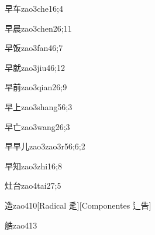 \begin{verbete}{早车}{zao3che1}{6;4}
\end{verbete}

\begin{verbete}{早晨}{zao3chen2}{6;11}
\end{verbete}

\begin{verbete}{早饭}{zao3fan4}{6;7}
\end{verbete}

\begin{verbete}{早就}{zao3jiu4}{6;12}
\end{verbete}

\begin{verbete}{早前}{zao3qian2}{6;9}
\end{verbete}

\begin{verbete}{早上}{zao3shang5}{6;3}
\end{verbete}

\begin{verbete}{早亡}{zao3wang2}{6;3}
\end{verbete}

\begin{verbete}{早早儿}{zao3zao3r5}{6;6;2}
\end{verbete}

\begin{verbete}{早知}{zao3zhi1}{6;8}
\end{verbete}

\begin{verbete}{灶台}{zao4tai2}{7;5}
\end{verbete}

\begin{verbete}{造}{zao4}{10}[Radical 辵][Componentes 辶告]
\end{verbete}

\begin{verbete}{艁}{zao4}{13}
\end{verbete}

